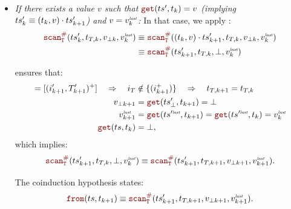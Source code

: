 \begin{skippableproof}
\begin{itemize}
\begin{itemize}
                  \item \textit{If there exists a value $v$ such that $\getAt{\ts'}{t_k} = v$
                        (implying $ts'_k \equiv (t_k, v) \cdot ts'_{k+1}$) and $v = v^{\textit{\tiny last}}_k$:}
                        In that case, we apply :
                        \begin{align*}
                            \scanAux{\ts'_k}{T}{t_{T, k}}{v_{\bot k}}{v^\explast_k} & \equiv
                            \scanAux{(t_k, v) \next \ts'_{k+1}}{T}{t_{T, k}}{v_{\bot k}}{v^\explast_k} \\
                                                                                    & \equiv
                            \scanAux{\ts'_{k+1}}{T}{t_{T, k}}{\bot}{v^\explast_k}
                        \end{align*}

                         ensures that:
                        \begin{align*}
                            [(i_{k+1}, T_{k+1})^+] = [(i'_{k+1}, T'_{k+1})^+] \quad \Rightarrow
                            \quad i_T        & \notin \{(i_{k+1}^+)\} \quad \Rightarrow \quad
                            t_{T, k+1} = t_{T, k}                                                                                         \\
                            v_{\bot k+1}     & = \getAt{\ts'_\bot}{t_{k+1}} = \bot                                                        \\
                            v^\explast_{k+1} & = \getAt{\ts^{\prime\explast}}{t_{k+1}} = \getAt{\ts^{\prime\explast}}{t_k} = v^\explast_k \\
                            \getAt{\ts}{t_k} & = \bot,
                        \end{align*}
                        which implies:
                        \begin{equation*}
                            \scanAux{\ts'_{k+1}}{T}{t_{T, k}}{\bot}{v^\explast_k} \equiv
                            \scanAux{\ts'_{k+1}}{T}{t_{T, k+1}}{v_{\bot k+1}}{v^\explast_{k+1}}.
                        \end{equation*}

                        The coinduction hypothesis states:
                        \begin{equation*}
                            \from{\ts}{t_{k+1}} \equiv \scanAux{\ts'_{k+1}}{T}{t_{T, k+1}}{v_{\bot k+1}}{v^\explast_{k+1}}.
                        \end{equation*}


\end{itemize}
\end{itemize}
\end{skippableproof}
